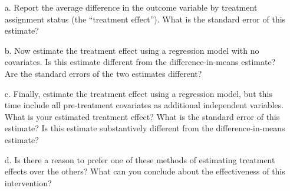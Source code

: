 \documentclass{article}
\begin{document}
\begin{itemize}
\item[a.] Report the average difference in the outcome variable by treatment
assignment status (the ``treatment effect''). What is the standard error of this estimate? 

\item[b.] Now estimate the treatment effect using a regression model with no
covariates. Is this estimate different from the
difference-in-means estimate? Are the standard errors of the two estimates different?

\item[c.] Finally, estimate the treatment effect using a regression model, but
this time include all pre-treatment covariates as additional independent
variables.  What is your estimated treatment effect? What is the
standard error of this estimate? Is this estimate substantively
different from the difference-in-means estimate?

\item[d.] Is there a reason to prefer one of these methods of
  estimating treatment effects over the others?  What can you conclude
  about the effectiveness of this intervention?





\end{itemize}

\end{document}
